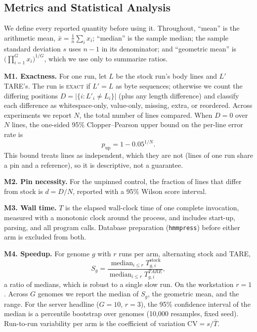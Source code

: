 \documentclass[letterpaper,twocolumn,10pt]{article}
\theoremstyle{definition}
\newcommand{\sys}{TARE\xspace}
\newcommand{\dec}[1]{\textsc{#1}}
\begin{document}
\subsection{Metrics and Statistical Analysis}
\label{sec:metrics}

We define every reported quantity before using it. Throughout, ``mean'' is the arithmetic mean, $\bar x =
\frac{1}{n}\sum_i x_i$; ``median'' is the sample median; the sample standard deviation $s$ uses $n-1$ in its
denominator; and ``geometric mean'' is $\big(\prod_{i=1}^{G} x_i\big)^{1/G}$, which we use only to summarize ratios.

\textbf{M1. Exactness.} For one run, let $L$ be the stock run's body lines and $L'$ \sys's. The run is \dec{exact} if
$L' = L$ as byte sequences; otherwise we count the differing positions $D = |\{i : L'_i \ne L_i\}|$ (plus any length
difference) and classify each difference as whitespace-only, value-only, missing, extra, or reordered. Across experiments
we report $N$, the total number of lines compared. When $D = 0$ over $N$ lines, the one-sided 95\% Clopper--Pearson upper
bound on the per-line error rate is
\begin{equation}
p_{\text{up}} = 1 - 0.05^{1/N}.
\label{eq:cp}
\end{equation}
This bound treats lines as independent, which they are not (lines of one run share a pin and a reference), so it is
descriptive, not a guarantee.

\textbf{M2. Pin necessity.} For the unpinned control, the fraction of lines that differ from stock is $d = D/N$, reported
with a 95\% Wilson score interval.

\textbf{M3. Wall time.} $T$ is the elapsed wall-clock time of one complete invocation, measured with a monotonic clock
around the process, and includes start-up, parsing, and all program calls. Database preparation (\texttt{hmmpress})
before either arm is excluded from both.

\textbf{M4. Speedup.} For genome $g$ with $r$ runs per arm, alternating stock and \sys,
\begin{equation}
S_g = \frac{\operatorname{median}_{i \le r} T^{\text{stock}}_{g,i}}{\operatorname{median}_{i \le r} T^{\sys}_{g,i}},
\label{eq:speedup}
\end{equation}
a ratio of medians, which is robust to a single slow run. On the workstation $r=1$. Across $G$ genomes we report the median of
$S_g$, the geometric mean, and the range. For the server headline ($G=10$, $r=3$), the 95\% confidence interval of the
median is a percentile bootstrap over genomes (10{,}000 resamples, fixed seed). Run-to-run variability per arm is the
coefficient of variation $\mathrm{CV} = s/\bar T$.
\end{document}
